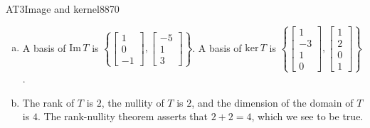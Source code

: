 \begin{exercise}{AT3}{Image and kernel}{8870}
\begin{exerciseAnswer}
\begin{enumerate}[(a)]
 
\item  

 A basis of \(\mathrm{Im}\,T\) is \(\left\{ \left[\begin{array}{c}
1 \\
0 \\
-1
\end{array}\right] , \left[\begin{array}{c}
-5 \\
1 \\
3
\end{array}\right] \right\}\). A basis of \(\mathrm{ker}\,T\) is \(\left\{ \left[\begin{array}{c}
1 \\
-3 \\
1 \\
0
\end{array}\right] , \left[\begin{array}{c}
1 \\
2 \\
0 \\
1
\end{array}\right] \right\}\). 

 
\item  

 The rank of \(T\) is \(2\), the nullity of \(T\) is \(2\), and the dimension of the domain of \(T\) is \(4\). The rank-nullity theorem asserts that \(2+2=4\), which we see to be true. 

 
\end{enumerate}

     \end{exerciseAnswer}
 \end{exercise}


